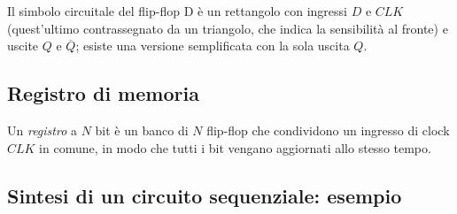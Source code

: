 \documentclass[11pt,a4paper]{article}
\begin{document}
Il simbolo circuitale del flip-flop D è un rettangolo con ingressi $D$ e $CLK$ (quest'ultimo contrassegnato da un triangolo, che indica la sensibilità al fronte) e uscite $Q$ e $\overline{Q}$; esiste una versione semplificata con la sola uscita $Q$.

\subsection{Registro di memoria}

\begin{definizione}
Un \emph{registro} a $N$ bit è un banco di $N$ flip-flop che condividono un ingresso di clock $CLK$ in comune, in modo che tutti i bit vengano aggiornati allo stesso tempo.
\end{definizione}

\subsection{Sintesi di un circuito sequenziale: esempio}
\end{document}
